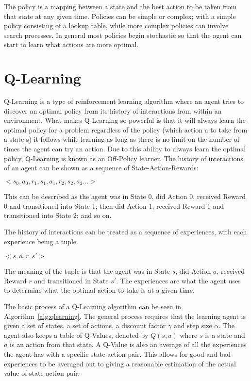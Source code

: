 The policy is a mapping between a state and the best action to be taken from that state at any given time. Policies can be simple or complex; with a simple policy consisting of a lookup table, while more complex policies can involve search processes. In general most policies begin stochastic so that the agent can start to learn what actions are more optimal.~\cite{barto1998reinforcement}

\section{Q-Learning}\label{sec:qlearning}
Q-Learning is a type of reinforcement learning algorithm where an agent tries to discover an optimal policy from its history of interactions from within an environment. What makes Q-Learning so powerful is that it will always learn the optimal policy for a problem regardless of the policy (which action a to take from a state s) it follows while learning as long as there is no limit on the number of times the agent can try an action. Due to this ability to always learn the optimal policy, Q-Learning is known as an Off-Policy learner. The history of interactions of an agent can be shown as a sequence of State-Action-Rewards:
\begin{center}
$<s_{0},a_{0},r_{1},s_{1},a_{1},r_{2},s_{2},a_{2}...>$
\end{center}
This can be described as the agent was in State 0, did Action 0, received Reward 0 and transitioned into State 1; then did Action 1, received Reward 1 and transitioned into State 2; and so on.

The history of interactions can be treated as a sequence of experiences, with each experience being a tuple.
\begin{center}
$<s,a,r,s'>$
\end{center}
The meaning of the tuple is that the agent was in State $s$, did Action $a$, received Reward $r$ and transitioned in State $s'$.  The experiences are what the agent uses to determine what the optimal action to take is at a given time.

The basic process of a Q-Learning algorithm can be seen in Algorithm~\ref{alg:qlearning}. The general process requires that the learning agent is given a set of states, a set of actions, a discount factor $\gamma$ and step size $\alpha$. The agent also keeps a table of Q-Values, denoted by $Q(s,a)$ where $s$ is a state and $a$ is an action from that state. A Q-Value is also an average of all the experiences the agent has with a specific state-action pair. This allows for good and bad experiences to be averaged out to giving a reasonable estimation of the actual value of state-action pair. 

